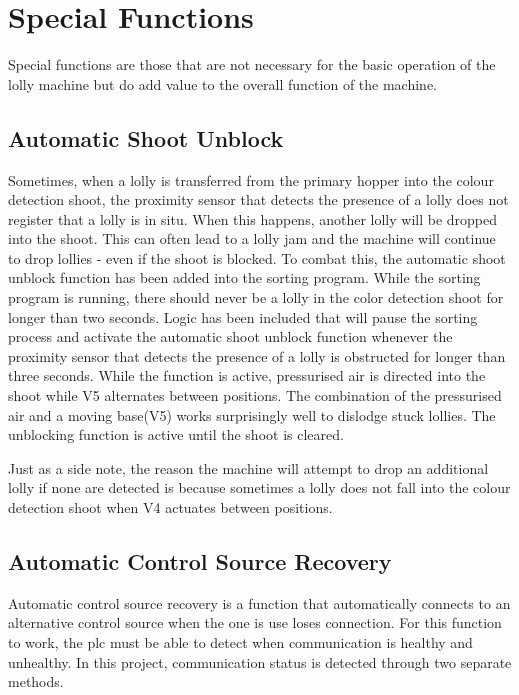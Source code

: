 \section{Special Functions}
    Special functions are those that are not necessary for the basic operation of the lolly machine but do add value to the overall function of the machine.

    \subsection{Automatic Shoot Unblock}
        Sometimes, when a lolly is transferred from the primary hopper into the colour detection shoot, the proximity sensor that detects the presence of a lolly does not register that a lolly is in situ. When this happens, another lolly will be dropped into the shoot. This can often lead to a lolly jam and the machine will continue to drop lollies - even if the shoot is blocked. To combat this, the automatic shoot unblock function has been added into the sorting program. While the sorting program is running, there should never be a lolly in the color detection shoot for longer than two seconds. Logic has been included that will pause the sorting process and activate the automatic shoot unblock function whenever the proximity sensor that detects the presence of a lolly is obstructed for longer than three seconds. While the function is active, pressurised air is directed into the shoot while V5 alternates between positions. The combination of the pressurised air and a moving base(V5) works surprisingly well to dislodge stuck lollies. The unblocking function is active until the shoot is cleared. 
        
        Just as a side note, the reason the machine will attempt to drop an additional lolly if none are detected is because sometimes a lolly does not fall into the colour detection shoot when V4 actuates between positions. 

    \subsection{Automatic Control Source Recovery} \label{sec:autoConRec}
        Automatic control source recovery is a function that automatically connects to an alternative control source when the one is use loses connection. For this function to work, the \acrshort{plc} must be able to detect when communication is healthy and unhealthy. In this project, communication status is detected through two separate methods. 

